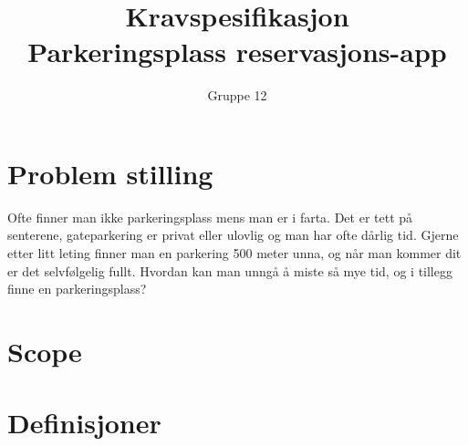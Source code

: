 \documentclass[12pt]{article}
\begin{document}
\title{%
    Kravspesifikasjon\\
    \large Parkeringsplass reservasjons-app }
\author{Gruppe 12}
\date{}
\maketitle

\newpage

\tableofcontents

\newpage

\section{Problem stilling}

Ofte finner man ikke parkeringsplass mens man er i farta. Det er tett på senterene, gateparkering er privat eller ulovlig og man har ofte dårlig tid. Gjerne etter litt leting finner man en parkering 500 meter unna, og når man kommer dit er det selvfølgelig fullt. Hvordan kan man unngå å miste så mye tid, og i tillegg finne en parkeringsplass?

\section{Scope}

\section{Definisjoner}
\end{document}
